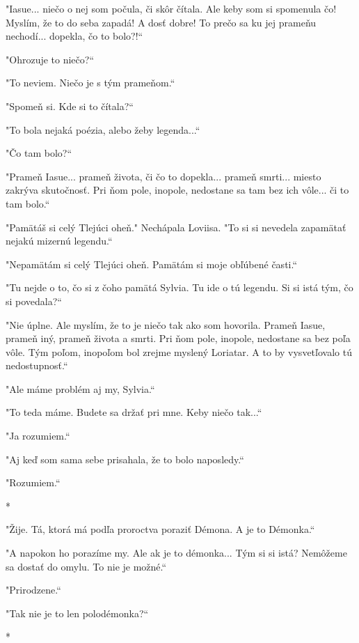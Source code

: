 \documentclass{book}
\begin{document}
"$ $Iasue... niečo o nej som počula, či skôr čítala. Ale keby som si spomenula čo! Myslím, že to do seba zapadá! A dosť dobre! To prečo sa ku jej prameňu nechodí... dopekla, čo to bolo?!“

"$ $Ohrozuje to niečo?“

"$ $To neviem. Niečo je s tým prameňom.“

"$ $Spomeň si. Kde si to čítala?“

"$ $To bola nejaká poézia, alebo žeby legenda...“

"$ $Čo tam bolo?“

"$ $Prameň Iasue... prameň života, či čo to dopekla... prameň smrti... miesto zakrýva skutočnosť. Pri ňom pole, inopole, nedostane sa tam bez ich vôle... či to tam bolo.“

"$ $Pamätáš si celý Tlejúci oheň."$ $ Nechápala Loviisa. "$ $To si si nevedela zapamätať nejakú mizernú legendu.“

"$ $Nepamätám si celý Tlejúci oheň. Pamätám si moje obľúbené časti.“

"$ $Tu nejde o to, čo si z čoho pamätá Sylvia. Tu ide o tú legendu. Si si istá tým, čo si povedala?“

"$ $Nie úplne. Ale myslím, že to je niečo tak ako som hovorila. Prameň Iasue, prameň iný, prameň života a smrti. Pri ňom pole, inopole, nedostane sa bez poľa vôle. Tým poľom, inopoľom bol zrejme myslený Loriatar. A to by vysvetľovalo tú nedostupnosť.“

"$ $Ale máme problém aj my, Sylvia.“

"$ $To teda máme. Budete sa držať pri mne. Keby niečo tak...“

"$ $Ja rozumiem.“

"$ $Aj keď som sama sebe prisahala, že to bolo naposledy.“

"$ $Rozumiem.“

\begin{center}

*

\end{center}

"$ $Žije. Tá, ktorá má podľa proroctva poraziť Démona. A je to Démonka.“

"$ $A napokon ho porazíme my. Ale ak je to démonka... Tým si si istá? Nemôžeme sa dostať do omylu. To nie je možné.“

"$ $Prirodzene.“

"$ $Tak nie je to len polodémonka?“

\begin{center}

*

\end{center}
\end{document}
